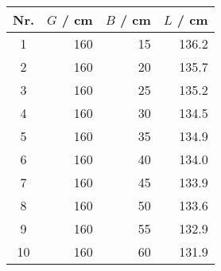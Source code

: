 \begin{tabular}{c|rrr}
Nr. & $G$ / cm & $B$ / cm & $L$ / cm \\
\hline
1 & 160 & 15 & 136.2\\
2 & 160 & 20 & 135.7\\
3 & 160 & 25 & 135.2\\
4 & 160 & 30 & 134.5\\
5 & 160 & 35 & 134.9\\
6 & 160 & 40 & 134.0\\
7 & 160 & 45 & 133.9\\
8 & 160 & 50 & 133.6\\
9 & 160 & 55 & 132.9\\
10 & 160 & 60 & 131.9
\end{tabular}
